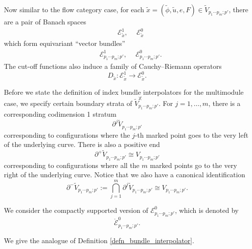 \documentclass[reqno, 10pt]{amsart}
\numberwithin{equation}{section}
\numberwithin{equation}{section}
\theoremstyle{definition}
\theoremstyle{remark}
\newcommand{\beqn}{\begin{equation*}}
\newcommand{\eeqn}{\end{equation*}}
\newcommand{\mb}{\mathbb}
\newcommand{\mc}{\mathcal}
\newcommand{\wt}{\widetilde}
\begin{document}
Now similar to the flow category case, for each $\wt x = (\wt \phi, \wt u, e, F) \in \wt V_{p_1\cdots p_m; p'}$, there are a pair of Banach spaces
\begin{align*}
&\ {\mc E}_{\wt x}^{1},\ &\ {\mc E}_{\wt x}^{0}
\end{align*}
which form equivariant ``vector bundles''
\begin{align*}
&\ {\mc E}_{p_1 \cdots p_m; p'}^1,\ &\ {\mc E}_{p_1 \cdots p_m; p'}^0.
\end{align*}
The cut-off functions also induce a family of Cauchy--Riemann operators
\beqn
D_{\wt x}: {\mc E}_{\wt x}^1 \to {\mc E}_{\wt x}^0.
\eeqn

Before we state the definition of index bundle interpolators for the multimodule case, we specify certain boundary strata of $\wt V_{p_1 \cdots p_m; p'}^{\mb X}$. For $j = 1, \ldots, m$, there is a corresponding codimension 1 stratum 
\beqn
\partial^j \wt V_{p_1 \cdots p_m; p'}
\eeqn
corresponding to configurations where the $j$-th marked point goes to the very left of the underlying curve. There is also a positive end
\beqn
\partial^+  \wt V_{p_1 \cdots p_m; p'} \cong V_{p_1 \cdots p_m; p'}
\eeqn
corresponding to configurations where all the $m$ marked points go to the very right of the underlying curve. Notice that we also have a canonical identification
\beqn
\partial^- \wt V_{p_1 \cdots p_m; p'}:= \bigcap_{j=1}^m \partial^j \wt V_{p_1 \cdots p_m; p'} \cong V_{p_1 \cdots p_m; p'}.
\eeqn

We consider the compactly supported version of ${\mc E}_{p_1 \cdots p_m; p'}^0$, which is denoted by 
\beqn
\mathring {\mc E}_{p_1 \cdots p_m; p'}^0.
\eeqn

We give the analogue of Definition \ref{defn_bundle_interpolator}.
\end{document}
